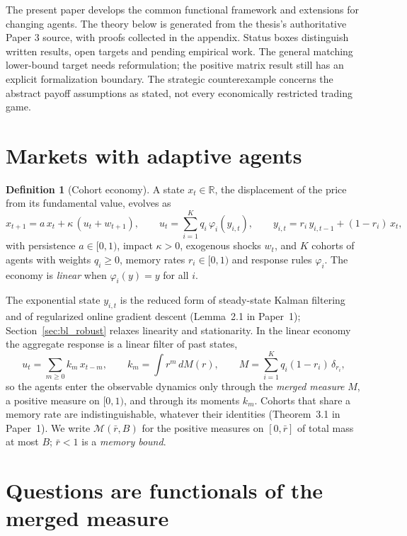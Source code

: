 \documentclass[11pt]{article}
\theoremstyle{definition}
\newtheorem{definition}[theorem]{Definition}
\theoremstyle{remark}
\newcommand{\R}{\mathbb{R}}
\begin{document}
The present paper develops the common functional framework and extensions for changing agents. The theory below is generated from the thesis's authoritative Paper 3 source, with proofs collected in the appendix. Status boxes distinguish written results, open targets and pending empirical work. The general matching lower-bound target needs reformulation; the positive matrix result still has an explicit formalization boundary. The strategic counterexample concerns the abstract payoff assumptions as stated, not every economically restricted trading game.

\section{Markets with adaptive agents}\label{sec:fw_model}

\begin{definition}[Cohort economy]\label{def:cohort}
A state $x_t\in\R$, the displacement of the price from its fundamental value, evolves as
\begin{equation}\label{eq:fw_plant}
x_{t+1}=a\,x_t+\kappa\,(u_t+w_{t+1}),\qquad u_t=\sum_{i=1}^K q_i\,\varphi_i(y_{i,t}),\qquad y_{i,t}=r_i\,y_{i,t-1}+(1-r_i)\,x_t,
\end{equation}
with persistence $a\in[0,1)$, impact $\kappa>0$, exogenous shocks $w_t$, and $K$ cohorts of agents with weights $q_i\ge0$, memory rates $r_i\in[0,1)$ and response rules $\varphi_i$. The economy is \emph{linear} when $\varphi_i(y)=y$ for all $i$.
\end{definition}

The exponential state $y_{i,t}$ is the reduced form of steady-state Kalman filtering and of regularized online gradient descent (Lemma~\textup{2.1 in Paper~1}); Section~\ref{sec:bl_robust} relaxes linearity and stationarity. In the linear economy the aggregate response is a linear filter of past states,
\[
u_t=\sum_{m\ge0}k_m\,x_{t-m},\qquad k_m=\int r^m\,dM(r),\qquad M=\sum_{i=1}^K q_i(1-r_i)\,\delta_{r_i},
\]
so the agents enter the observable dynamics only through the \emph{merged measure} $M$, a positive measure on $[0,1)$, and through its moments $k_m$. Cohorts that share a memory rate are indistinguishable, whatever their identities (Theorem~\textup{3.1 in Paper~1}). We write $\mathcal M(\bar r,B)$ for the positive measures on $[0,\bar r]$ of total mass at most $B$; $\bar r<1$ is a \emph{memory bound}.

\section{Questions are functionals of the merged measure}\label{sec:fw_questions}
\end{document}
